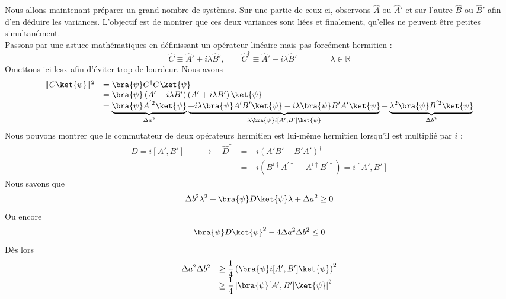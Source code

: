  
 Nous allons maintenant préparer un grand nombre de systèmes. Sur une partie de ceux-ci, 
 observons $\hat{A}$ ou $\hat{A}'$ et sur l'autre $\hat{B}$ ou $\hat{B}'$ afin d'en 
 déduire les variances. L'objectif est de montrer que ces deux variances sont liées et 
 finalement, qu'elles ne peuvent être petites simultanément.\\
 Passons par une astuce mathématiques en définissant un opérateur linéaire mais pas 
 forcément hermitien :
 \begin{equation}
 \hat{C} \equiv \hat{A}' + i\lambda \hat{B}',\qquad
  \hat{C}^\dagger \equiv \hat{A}' - i\lambda \hat{B}'\qquad\qquad\lambda\in\mathbb{R}
 \end{equation}
 Omettons ici les $\hat{\ }$  afin d'éviter trop de lourdeur. Nous avons
 \begin{equation}
 \begin{array}{ll}
 \|C\ket{\psi}\|^2 &= \bra{\psi}C^\dagger C\ket{\psi}\\
 &= \bra{\psi}\left(A'-i\lambda B'\right)\left(A'+i\lambda B'\right)\ket{\psi}\\
 &= \underbrace{\bra{\psi}A^{'2}\ket{\psi}}_{\Delta a^2}\underbrace{+i\lambda\bra{\psi}
 A'B'\ket{\psi}-i\lambda\bra{\psi}B'A'\ket{\psi}}_{\lambda\bra{\psi}i[A',B']\ket{\psi}} 
 + \underbrace{\lambda^2\bra{\psi}B^{'2}\ket{\psi}}_{ \Delta b^2}
 \end{array}
 \end{equation}
 Nous pouvons montrer que le commutateur de deux opérateurs hermitien est lui-même 
 hermitien lorsqu'il est multiplié par $i$ :
 \begin{equation}
 \begin{array}{ll}
 \hat{D} = i[A',B']\qquad \rightarrow\quad \hat{D}^\dagger &=-i(A'B'-B'A')^\dagger\\
 &= -i(B^{i\dagger}A^{'\dagger}-A^{i\dagger}B^{'\dagger}) = i[A',B']
 \end{array}
 \end{equation}
 Nous savons que
 \begin{equation}
 \Delta b^2\lambda^2 + \bra{\psi}D\ket{\psi}\lambda + \Delta a^2 \geq 0
 \end{equation}
 Ou encore
 \begin{equation}
 \bra{\psi}D\ket{\psi}^2 - 4\Delta a^2\Delta b^2 \leq 0
 \end{equation}
 Dès lors
 \begin{equation}
 \begin{array}{ll}
 \Delta a^2 \Delta b^2 &\geq \dfrac{1}{4}\left(\bra{\psi}i[A',B']\ket{\psi}\right)^2\\
 &\geq \dfrac{1}{4}\left|\bra{\psi}[A',B']\ket{\psi}\right|^2
 \end{array}
 \end{equation}

